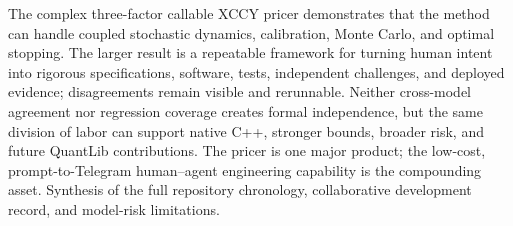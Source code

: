 {The complex three-factor callable XCCY pricer demonstrates that the method can handle coupled stochastic dynamics, calibration, Monte Carlo, and optimal stopping.}
{The larger result is a repeatable framework for turning human intent into rigorous specifications, software, tests, independent challenges, and deployed evidence; disagreements remain visible and rerunnable.}
{Neither cross-model agreement nor regression coverage creates formal independence, but the same division of labor can support native C++, stronger bounds, broader risk, and future QuantLib contributions.}
{The pricer is one major product; the low-cost, prompt-to-Telegram human--agent engineering capability is the compounding asset.}
{Synthesis of the full repository chronology, collaborative development record, and model-risk limitations.}
